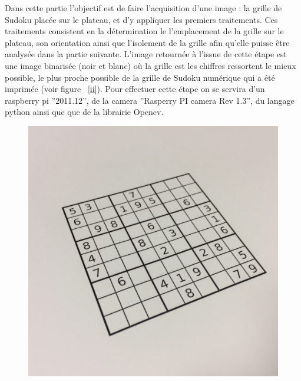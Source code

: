 \documentclass[11pt]{article}
\begin{document}
Dans cette partie l'objectif est de faire l'acquisition d'une image : la grille de Sudoku placée sur le plateau, et d'y appliquer les premiers traitements. Ces traitements consistent en la détermination le l'emplacement de la grille sur le plateau, son orientation ainsi que l'isolement de la grille afin qu'elle puisse être analysée dans la partie suivante. L'image retournée à l'issue de cette étape est une image binarisée (noir et blanc) où la grille est les chiffres ressortent le mieux possible, le plus proche possible de la grille de Sudoku numérique qui a été imprimée (voir figure ~\ref{ii}). Pour effectuer cette étape on se servira d'un raspberry pi ''2011.12'', de la camera ''Rasperry PI camera Rev 1.3'', du langage python ainsi que que de la librairie Opencv.\\
\begin{figure}[!h]
	\centering
   	\includegraphics[scale = 0.07]{ii.jpg}

\end{figure}
\end{document}

